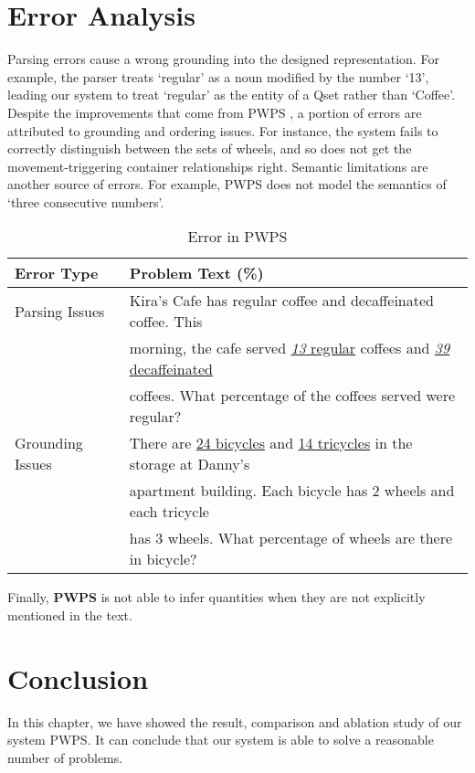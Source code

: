 \documentclass[document.tex]{subfiles}
\begin{document}
\section{Error Analysis}
Parsing errors cause a wrong grounding into the
designed representation. For example, the parser
treats ‘regular’ as a noun modified by the number
‘13’, leading our system to treat ‘regular’ as the entity of a Qset rather than ‘Coffee’. Despite the
improvements that come from PWPS , a portion of
errors are attributed to grounding and ordering issues. For instance, the system fails to correctly distinguish between the sets of wheels, and so does not get the movement-triggering container relationships right. Semantic limitations are another source of errors. For example, PWPS does not model the semantics of ‘three consecutive numbers’. 
\begin{table}[H]
	\caption{Error in PWPS}
	\begin{center}
		\begin{tabular}{|l|l|}
			\hline
			Error Type & Problem Text (\%)\\
			\hline
			Parsing Issues& Kira’s Cafe has regular coffee and decaffeinated coffee. This  \\
			&morning, the cafe served \underline{\textit{13} regular} coffees and \underline{\textit{39} decaffeinated}\\
			& coffees. What percentage of the coffees served were regular?\\
			\hline
			Grounding Issues & There are \underline{24 bicycles} and \underline{14 tricycles} in the storage at Danny’s\\
			& apartment building. Each bicycle has 2 wheels and each tricycle \\
			&has 3 wheels. What percentage of wheels are there in bicycle?\\
			\hline
		\end{tabular}
	\end{center}
	\label{tab:grounding}
\end{table}
Finally, \textbf{PWPS} is not able to infer quantities when they are not explicitly mentioned in the text. 
\section{Conclusion} In this chapter, we have showed the result, comparison and ablation study of our system PWPS. It can conclude that our system is able to solve a reasonable number of problems.
\end{document}
